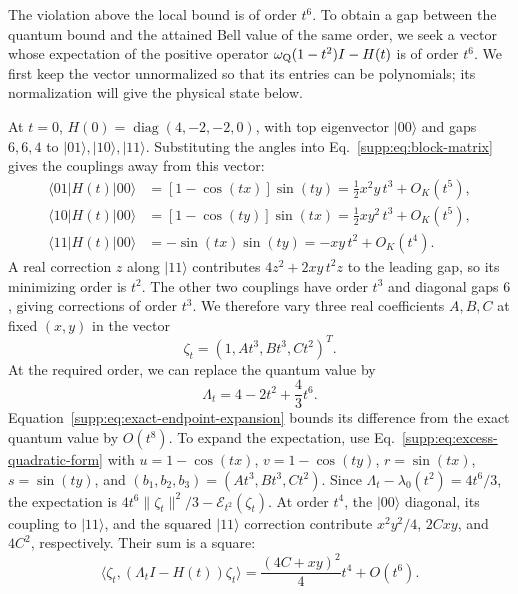 \documentclass[aps,prl,onecolumn,10pt,superscriptaddress,nofootinbib,longbibliography]{revtex4-2}
\theoremstyle{remark}
\begin{document}
The violation above the local bound is of order $t^6$. To obtain a gap between the quantum bound and the attained Bell value of the same order, we seek a vector whose expectation of the positive operator $\omega_{\rm Q}(1-t^2)I-H(t)$ is of order $t^6$. We first keep the vector unnormalized so that its entries can be polynomials; its normalization will give the physical state below.

At $t=0$, $H(0)=\operatorname{diag}(4,-2,-2,0)$, with top eigenvector $|00\rangle$ and gaps $6,6,4$ to $|01\rangle,|10\rangle,|11\rangle$. Substituting the angles into Eq.~\eqref{supp:eq:block-matrix} gives the couplings away from this vector:
\[
\begin{aligned}
\langle01|H(t)|00\rangle&=[1-\cos(tx)]\sin(ty)
=\tfrac12 x^2y\,t^3+O_K(t^5),\\
\langle10|H(t)|00\rangle&=[1-\cos(ty)]\sin(tx)
=\tfrac12 xy^2\,t^3+O_K(t^5),\\
\langle11|H(t)|00\rangle&=-\sin(tx)\sin(ty)
=-xy\,t^2+O_K(t^4).
\end{aligned}
\]
A real correction $z$ along $|11\rangle$ contributes $4z^2+2xy\,t^2z$ to the leading gap, so its minimizing order is $t^2$. The other two couplings have order $t^3$ and diagonal gaps $6$, giving corrections of order $t^3$. We therefore vary three real coefficients $A,B,C$ at fixed $(x,y)$ in the vector
\begin{equation}
\zeta_t=(1,At^3,Bt^3,Ct^2)^T.
\label{supp:eq:generic-scaled-vector}
\end{equation}
At the required order, we can replace the quantum value by
\begin{equation}
\Lambda_t=4-2t^2+\frac43t^6.
\label{supp:eq:Lambda-t}
\end{equation}
Equation~\eqref{supp:eq:exact-endpoint-expansion} bounds its difference from the exact quantum value by $O(t^8)$. To expand the expectation, use Eq.~\eqref{supp:eq:excess-quadratic-form} with $u=1-\cos(tx)$, $v=1-\cos(ty)$, $r=\sin(tx)$, $s=\sin(ty)$, and $(b_1,b_2,b_3)=(At^3,Bt^3,Ct^2)$. Since $\Lambda_t-\lambda_0(t^2)=4t^6/3$, the expectation is $4t^6\|\zeta_t\|^2/3-\mathcal E_{t^2}(\zeta_t)$. At order $t^4$, the $|00\rangle$ diagonal, its coupling to $|11\rangle$, and the squared $|11\rangle$ correction contribute $x^2y^2/4$, $2Cxy$, and $4C^2$, respectively. Their sum is a square:
\begin{equation}
\langle\zeta_t,(\Lambda_tI-H(t))\zeta_t\rangle
=\frac{(4C+xy)^2}{4}t^4+O(t^6).
\label{supp:eq:generic-gap-expansion}
\end{equation}
\end{document}
